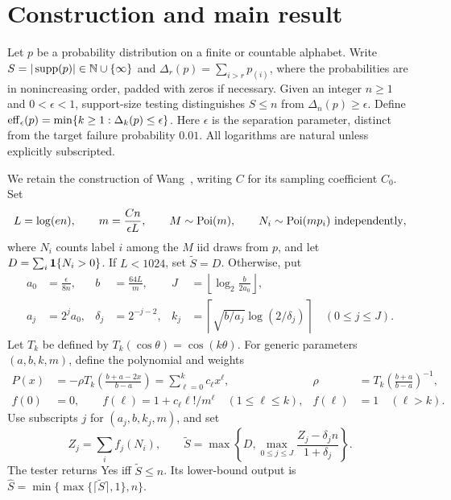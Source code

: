 \section{Construction and main result}
Let $p$ be a probability distribution on a finite or countable alphabet.
Write $S=|\operatorname{supp}(p)|\in\mathbb N\cup\{\infty\}$ and
$\Delta_r(p)=\sum_{i>r}p_{(i)}$, where the probabilities are in nonincreasing
order, padded with zeros if necessary. Given an integer $n\ge1$ and
$0<\epsilon<1$, support-size testing distinguishes
$S\le n$ from $\Delta_n(p)\ge\epsilon$. Define
$\operatorname{eff}_\epsilon(p)=\min\{k\ge1:\Delta_k(p)\le\epsilon\}$.
Here $\epsilon$ is the separation parameter, distinct from the target
failure probability $0.01$.
All logarithms are natural unless explicitly subscripted.

We retain the construction of Wang~\cite[Section~3]{wang}, writing $C$ for
its sampling coefficient $C_0$. Set
\begin{equation}
 L=\log(en),\qquad m=\frac{Cn}{\epsilon L},\qquad
 M\sim\operatorname{Poi}(m),\qquad N_i\sim\operatorname{Poi}(mp_i)\ \text{independently},
 \label{eq:budget}
\end{equation}
where $N_i$ counts label $i$ among the $M$ iid draws from $p$, and let
$D=\sum_i\mathbf 1\{N_i>0\}$. If $L<1024$, set $\widetilde S=D$.
Otherwise, put
\begin{align}
 a_0&=\frac{\epsilon}{8n},& b&=\frac{64L}{m},&
 J&=\left\lfloor\log_2\frac b{2a_0}\right\rfloor,\label{eq:scales1}\\
 a_j&=2^ja_0,& \delta_j&=2^{-j-2},&
 k_j&=\left\lceil\sqrt{b/a_j}\log(2/\delta_j)\right\rceil
 \quad(0\le j\le J).\label{eq:scales2}
\end{align}
Let $T_k$ be defined by $T_k(\cos\theta)=\cos(k\theta)$.
For generic parameters $(a,b,k,m)$, define the polynomial and weights
\begin{align}
 P(x)&=-\rho T_k\!\left(\frac{b+a-2x}{b-a}\right)
       =\sum_{\ell=0}^k c_\ell x^\ell,
 &\rho&=T_k\!\left(\frac{b+a}{b-a}\right)^{-1},\label{eq:polynomial}\\
 f(0)&=0,\qquad
 f(\ell)=1+c_\ell\ell!/m^\ell\quad(1\le\ell\le k),
 & f(\ell)&=1\quad(\ell>k).\label{eq:weights}
\end{align}
Use subscripts $j$ for $(a_j,b,k_j,m)$, and set
\begin{equation}
 Z_j=\sum_i f_j(N_i),\qquad
 \widetilde S=\max\left\{D,\max_{0\le j\le J}
                  \frac{Z_j-\delta_jn}{1+\delta_j}\right\}.
 \label{eq:statistic}
\end{equation}
The tester returns Yes iff $\widetilde S\le n$. Its lower-bound output is
$\widehat S=\min\{\max\{\lceil\widetilde S\rceil,1\},n\}$.

